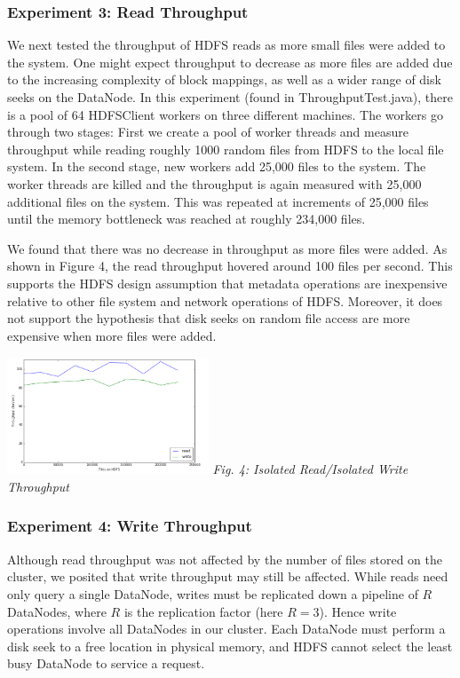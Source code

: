 \documentclass[11pt, a4paper]{article}
\begin{document}
\begin{multicols*}{2}
\subsubsection{Experiment 3: Read Throughput}\label{ReadThroughput}
We next tested the throughput of HDFS reads as more small files were added to the system. One might expect throughput to decrease as more files are added due to the increasing complexity of block mappings, as well as a wider range of disk seeks on the DataNode. In this experiment (found in ThroughputTest.java), there is a pool of 64 HDFSClient workers on three different machines. The workers go through two stages: First we create a pool of worker threads and measure throughput while reading roughly 1000 random files from HDFS to the local file system. In the second stage, new workers add 25,000 files to the system. The worker threads are killed and the throughput is again measured with 25,000 additional files on the system. This was repeated at increments of 25,000 files until the memory bottleneck was reached at roughly 234,000 files.

We found that there was no decrease in throughput as more files were added. As shown in Figure 4, the read throughput hovered around 100 files per second. This supports the HDFS design assumption that metadata operations are inexpensive relative to other file system and network operations of HDFS. Moreover, it does not support the hypothesis that disk seeks on random file access are more expensive when more files were added.

\begin{center}
	\includegraphics[keepaspectratio=true, width=0.45\textwidth]{ThroughputResults}
	\textit{Fig. 4: Isolated Read/Isolated Write Throughput}
\end{center}
\subsubsection{Experiment 4: Write Throughput}\label{WriteThroughput}
Although read throughput was not affected by the number of files stored on the cluster, we posited that write throughput may still be affected. While reads need only query a single DataNode, writes must be replicated down a pipeline of $R$ DataNodes, where $R$ is the replication factor (here $R = 3$). Hence write operations involve  all DataNodes in our cluster. Each DataNode must perform a disk seek to a free location in physical memory, and HDFS cannot select the least busy DataNode to service a request.


\end{multicols*}
\end{document}
